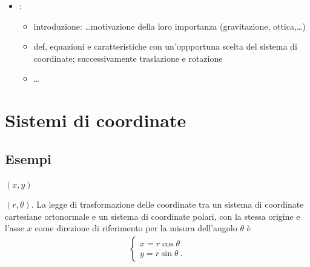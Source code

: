 \documentclass[letterpaper,10pt,italian]{jupyterBook}
\begin{document}
\begin{itemize}
\begin{itemize}
\begin{itemize}
\item {} 
\sphinxAtStartPar
posizione relativa punto\sphinxhyphen{}retta, distanza punto\sphinxhyphen{}retta, posizione relativa retta\sphinxhyphen{}retta

\end{itemize}

\item {} 
\sphinxAtStartPar
{}:
\begin{itemize}
\item {} 
\sphinxAtStartPar
introduzione: …motivazione della loro importanza (gravitazione, ottica,…)

\item {} 
\sphinxAtStartPar
def, equazioni e caratteristiche con un’oppportuna scelta del sistema di coordinate; successivamente traslazione e rotazione

\item {} 
\sphinxAtStartPar
…

\end{itemize}

\end{itemize}

\end{itemize}

\sphinxstepscope


\section{Sistemi di coordinate}
\label{\detokenize{ch/analytic_geometry/analytic_geometry_2d/coordinates:sistemi-di-coordinate}}\label{\detokenize{ch/analytic_geometry/analytic_geometry_2d/coordinates:geometry-analytic-2d-coordinates}}\label{\detokenize{ch/analytic_geometry/analytic_geometry_2d/coordinates::doc}}

\subsection{Esempi}
\label{\detokenize{ch/analytic_geometry/analytic_geometry_2d/coordinates:esempi}}
\sphinxAtStartPar
{} \((x, y)\)

\sphinxAtStartPar
{} \((r, \theta)\). La legge di trasformazione delle coordinate tra un sistema di coordinate cartesiane ortonormale e un sistema di coordinate polari, con la stessa origine e l’asse \(x\) come direzione di riferimento per la misura dell’angolo \(\theta\) è
\begin{equation*}
\begin{split}\begin{cases}
  x = r \cos \theta \\
  y = r \sin \theta \ .
\end{cases}\end{split}
\end{equation*}
\end{document}
